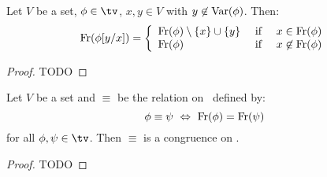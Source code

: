 \begin{prop}\label{logic:prop:LAM:freevar:single:subst}
    Let $V$ be a set, $\phi\in\tv$, $x,y\in V$ with $y\not\in\mbox{\rm Var}(\phi)$. Then:
    \[
        \mbox{\rm Fr}(\phi[y/x])=
            \left\{\begin{array}{lcl}
                \mbox{\rm Fr}(\phi)\setminus\{x\}\cup\{y\}
                    &\mbox{\ if\ }&
                x\in\mbox{\rm Fr}(\phi)
                \\
                \mbox{\rm Fr}(\phi)
                    &\mbox{\ if\ }&
                x\not\in\mbox{\rm Fr}(\phi)
            \end{array}\right.
    \]
\end{prop}
\begin{proof}
TODO
\end{proof}

\begin{prop}\label{logic:prop:LAM:congruence:freevar}
Let $V$ be a set and $\equiv$ be the relation on \tv\ defined by:
    \[
    \phi\equiv\psi\ \Leftrightarrow\ \free(\phi)=\free(\psi)
    \]
for all $\phi,\psi\in\tv$. Then $\equiv$ is a congruence on \tv.
\end{prop}
\begin{proof}
TODO
\end{proof}



